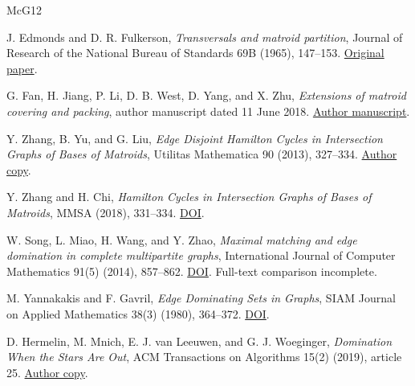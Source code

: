 \documentclass[11pt]{article}
\begin{document}
\begin{thebibliography}{McG12}\small\raggedright

\hypertarget{refEF65}{}J. Edmonds and D. R. Fulkerson, \emph{Transversals and matroid partition}, Journal of Research of the National Bureau of Standards 69B (1965), 147--153. \href{https://nvlpubs.nist.gov/nistpubs/jres/69B/jresv69Bn3p147_A1b.pdf}{Original paper}.

\hypertarget{refFJ18}{}G. Fan, H. Jiang, P. Li, D. B. West, D. Yang, and X. Zhu, \emph{Extensions of matroid covering and packing}, author manuscript dated 11 June 2018. \href{https://dwest.web.illinois.edu/pubs/matrunc.pdf}{Author manuscript}.

\hypertarget{refZY13}{}Y. Zhang, B. Yu, and G. Liu, \emph{Edge Disjoint Hamilton Cycles in Intersection Graphs of Bases of Matroids}, Utilitas Mathematica 90 (2013), 327--334. \href{https://yu.trubox.ca/wp-content/uploads/sites/2481/2021/03/67_Edge-disjoint-H-cycle-in-matroidUM2013Zhang-Yu.pdf}{Author copy}.

\hypertarget{refZC18}{}Y. Zhang and H. Chi, \emph{Hamilton Cycles in Intersection Graphs of Bases of Matroids}, MMSA (2018), 331--334. \href{https://doi.org/10.2991/mmsa-18.2018.73}{DOI}.

\hypertarget{refSM14}{}W. Song, L. Miao, H. Wang, and Y. Zhao, \emph{Maximal matching and edge domination in complete multipartite graphs}, International Journal of Computer Mathematics 91(5) (2014), 857--862. \href{https://doi.org/10.1080/00207160.2013.818668}{DOI}. Full-text comparison incomplete.

\hypertarget{refYG80}{}M. Yannakakis and F. Gavril, \emph{Edge Dominating Sets in Graphs}, SIAM Journal on Applied Mathematics 38(3) (1980), 364--372. \href{https://doi.org/10.1137/0138030}{DOI}.

\hypertarget{refHM19}{}D. Hermelin, M. Mnich, E. J. van Leeuwen, and G. J. Woeginger, \emph{Domination When the Stars Are Out}, ACM Transactions on Algorithms 15(2) (2019), article 25. \href{https://dspace.library.uu.nl/bitstream/handle/1874/382146/a25_hermelin.pdf?sequence=1}{Author copy}.


\end{thebibliography}
\end{document}
